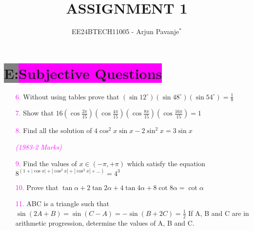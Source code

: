 \documentclass[journal,12pt,article,twocolumn]{IEEEtran}
\theoremstyle{remark}
\begin{document}

\vspace{3cm}

\title{ASSIGNMENT 1}
\author{EE24BTECH11005 - Arjun Pavanje$^{*}$%
}
\maketitle
\newpage
\bigskip
\section*{\color{black}\colorbox{gray}{\textbf{\large {E:}}}\color{white}\colorbox{magenta}{\textbf{\large {Subjective Questions}}}}
\begin{enumerate}
\item[{\textcolor{magenta}{6.}}] Without using tables prove that $(\sin{12^\circ} )(\sin{48^\circ})
(\sin{54^\circ})= \frac{1}{8}$
\begin{flushright}
\textcolor{magenta}{\textit{}} 
\end{flushright}
\item[\textcolor{magenta}{7.}] Show that $16(\cos{\frac{2\pi}{15}})(\cos{\frac{4\pi}{15}})(\cos{\frac{8\pi}{15}})(\cos{\frac{16\pi}{15}})=1$
\begin{flushright}
  \textcolor{magenta}{\textit{}} 
\end{flushright}
\item[\textcolor{magenta}{8.}] Find all the solution of $4\cos^2x \sin x -2\sin^2x = 3\sin x$
\begin{flushright}
    \textcolor{magenta}{\textit{(1983-2 Marks)}} 
\end{flushright}
\item[\textcolor{magenta}{9.}] Find the values of \( x \in (-\pi, +\pi) \) which satisfy the equation
$8^{(1+|\cos x|+|\cos^2x|+|\cos^3x|+\dots)}= 4^3$
\begin{flushright}
   \textcolor{magenta}{\textit{}}  
\end{flushright}
\item[\textcolor{magenta}{10.}] Prove that $\tan \alpha+2\tan 2\alpha+4\tan 4\alpha+8\cot 8\alpha=\cot \alpha$
\begin{flushright}
    \textcolor{magenta}{\textit{}} 
\end{flushright}
\item[\textcolor{magenta}{11.}] ABC is a triangle such that $\sin{(2A+B)}=\sin{(C-A)}=-\sin{(B+2C)}=\frac{1}{2}$ If A, B and C are in arithmetic progression, determine the values of A, B and C. 

\end{enumerate}
\end{document}
